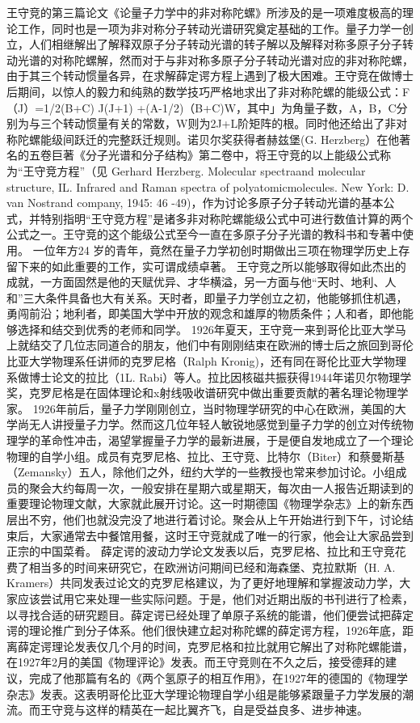 王守竞的第三篇论文《论量子力学中的非对称陀螺》所涉及的是一项难度极高的理论工作，同时也是一项为非对称分子转动光谱研究奠定基础的工作。量子力学一创立，人们相继解出了解释双原子分子转动光谱的转子解以及解释对称多原子分子转动光谱的对称陀螺解，然而对于与非对称多原子分子转动光谱对应的非对称陀螺，由于其三个转动惯量各异，在求解薛定谔方程上遇到了极大困难。王守竞在做博士后期间，以惊人的毅力和纯熟的数学技巧严格地求出了非对称陀螺的能级公式：F（J）=1/2(B+C) J(J+1) +(A-1/2)（B+C)W，其中」为角量子数，A，B，C分别为与三个转动惯量有关的常数，W则为2J+L阶矩阵的根。同时他还给出了非对称陀螺能级间跃迁的完整跃迁规则。诺贝尔奖获得者赫兹堡(G. Herzberg）在他著名的五卷巨著《分子光谱和分子结构》第二卷中，将王守竞的以上能级公式称为“王守竞方程”（见 Gerhard Herzberg. Molecular spectraand molecular structure, IL. Infrared and Raman spectra of polyatomicmolecules. New York: D. van Nostrand company, 1945: 46 -49)，作为讨论多原子分子转动光谱的基本公式，并特别指明“王守竞方程”是诸多非对称陀螺能级公式中可进行数值计算的两个公式之一。王守竞的这个能级公式至今一直在多原子分子光谱的教科书和专著中使用。
一位年方24 岁的青年，竟然在量子力学初创时期做出三项在物理学历史上存留下来的如此重要的工作，实可谓成绩卓著。
王守竞之所以能够取得如此杰出的成就，一方面固然是他的天赋优异、才华横溢，另一方面与他“天时、地利、人和”三大条件具备也大有关系。天时者，即量子力学创立之初，他能够抓住机遇，勇闯前沿；地利者，即美国大学中开放的观念和雄厚的物质条件；人和者，即他能够选择和结交到优秀的老师和同学。
1926年夏天，王守竞一来到哥伦比亚大学马上就结交了几位志同道合的朋友，他们中有刚刚结束在欧洲的博士后之旅回到哥伦比亚大学物理系任讲师的克罗尼格（Ralph Kronig)，还有同在哥伦比亚大学物理系做博士论文的拉比（1L. Rabi）等人。拉比因核磁共振获得1944年诺贝尔物理学奖，克罗尼格是在固体理论和x射线吸收谱研究中做出重要贡献的著名理论物理学家。
1926年前后，量子力学刚刚创立，当时物理学研究的中心在欧洲，美国的大学尚无人讲授量子力学。然而这几位年轻人敏锐地感觉到量子力学的创立对传统物理学的革命性冲击，渴望掌握量子力学的最新进展，于是便自发地成立了一个理论物理的自学小组。成员有克罗尼格、拉比、王守竞、比特尔（Biter）和蔡曼斯基（Zemansky）五人，除他们之外，纽约大学的一些教授也常来参加讨论。小组成员的聚会大约每周一次，一般安排在星期六或星期天，每次由一人报告近期读到的重要理论物理文献，大家就此展开讨论。这一时期德国《物理学杂志》上的新东西层出不穷，他们也就没完没了地进行着讨论。聚会从上午开始进行到下午，讨论结束后，大家通常去中餐馆用餐，这时王守竞就成了唯一的行家，他会让大家品尝到正宗的中国菜肴。
薛定谔的波动力学论文发表以后，克罗尼格、拉比和王守竞花费了相当多的时间来研究它，在欧洲访问期间已经和海森堡、克拉默斯（H. A. Kramers）共同发表过论文的克罗尼格建议，为了更好地理解和掌握波动力学，大家应该尝试用它来处理一些实际问题。于是，他们对近期出版的书刊进行了检素，以寻找合适的研究题目。薛定谔已经处理了单原子系统的能谱，他们便尝试把薛定谔的理论推广到分子体系。他们很快建立起对称陀螺的薛定谔方程，1926年底，距离薛定谔理论发表仅几个月的时间，克罗尼格和拉比就用它解出了对称陀螺能谱，在1927年2月的美国《物理评论》发表。而王守竞则在不久之后，接受德拜的建议，完成了他那篇有名的《两个氢原子的相互作用》，在1927年的德国的《物理学杂志》发表。这表明哥伦比亚大学理论物理自学小组是能够紧跟量子力学发展的潮流。而王守竞与这样的精英在一起比翼齐飞，自是受益良多、进步神速。
